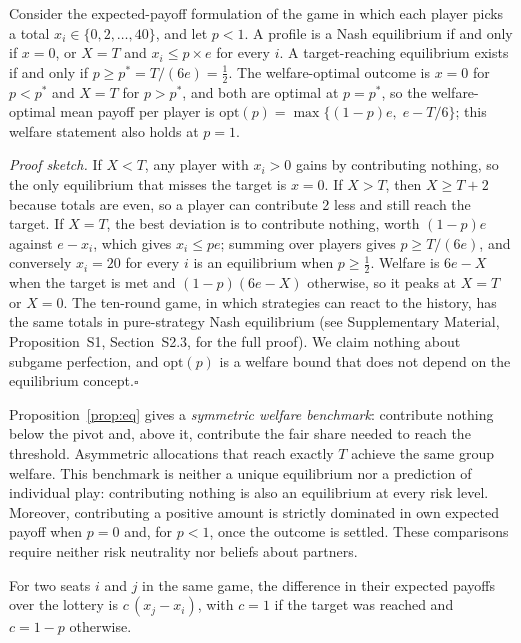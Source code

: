 \documentclass[sigconf,anonymous]{aamas}
\newcommand{\popt}{p^{*}}
\begin{document}
\begin{proposition}
\label{prop:eq}
Consider the expected-payoff formulation of the game in which each player picks a total $x_i\in\{0,2,\dots,40\}$, and let $p<1$. A profile is a Nash equilibrium if and only if $x=0$, or $X=T$ and $x_i\le p\times e$ for every $i$. A target-reaching equilibrium exists if and only if $p\ge\popt=T/(6e)=\tfrac12$. The welfare-optimal outcome is $x=0$ for $p<\popt$ and $X=T$ for $p>\popt$, and both are optimal at $p=\popt$, so the welfare-optimal mean payoff per player is $\mathrm{opt}(p)=\max\{(1-p)e,\;e-T/6\}$; this welfare statement also holds at $p=1$.
\end{proposition}

\noindent\emph{Proof sketch.} If $X<T$, any player with $x_i>0$ gains by contributing  nothing, so the only equilibrium that misses the target is $x=0$. If $X>T$, then $X\ge T+2$ because totals are even, so a player can contribute 2 less and still reach the target. If $X=T$, the best deviation is to contribute nothing, worth $(1-p)e$ against $e-x_i$, which gives $x_i\le pe$; summing over players gives $p\ge T/(6e)$, and conversely $x_i=20$ for every $i$ is an equilibrium when $p\ge\tfrac12$. Welfare is $6e-X$ when the target is met and $(1-p)(6e-X)$ otherwise, so it peaks at $X=T$ or $X=0$. The ten-round game, in which strategies can react to the history, has the same totals in pure-strategy Nash equilibrium (see Supplementary Material, Proposition~S1, Section~S2.3, for the full proof). We claim nothing about subgame perfection, and $\mathrm{opt}(p)$ is a welfare bound that does not depend on the equilibrium concept.\hfill$\square$

Proposition~\ref{prop:eq} gives a \emph{symmetric welfare benchmark}: contribute nothing below the pivot and, above it, contribute the fair share needed to reach the threshold. Asymmetric allocations that reach exactly $T$ achieve the same group welfare. This benchmark is neither a unique equilibrium nor a prediction of individual play: contributing nothing is also an equilibrium at every risk level. Moreover, contributing a positive amount is strictly dominated in own expected payoff when $p=0$ and, for $p<1$, once the outcome is settled. These comparisons require neither risk neutrality nor beliefs about partners. %

\begin{proposition}
\label{prop:table}
For two seats $i$ and $j$ in the same game, the difference in their expected payoffs over the lottery is $c\,(x_j-x_i)$, with $c=1$ if the target was reached and $c=1-p$ otherwise.
\end{proposition}
\end{document}
